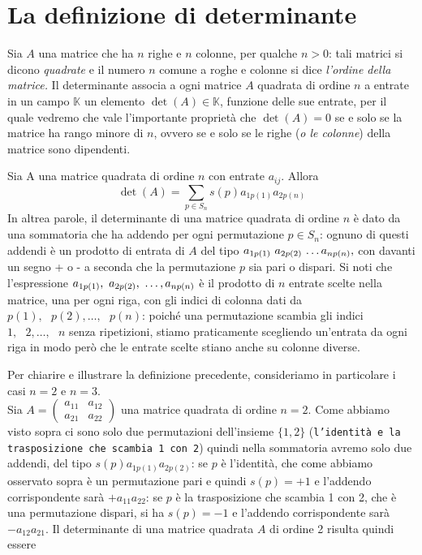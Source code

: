 \section{La definizione di determinante}
Sia $A$ una matrice che ha $n$ righe e $n$ colonne, per qualche $n>0$: tali matrici si dicono {\it quadrate} e il numero $n$ comune a roghe e colonne si dice {\it l'ordine della matrice.} Il determinante associa a ogni matrice $A$ quadrata di ordine $n$ a entrate in un campo $\mathds{K}$ un elemento $\det(A) \in \mathds{K}$, funzione delle sue entrate, per il quale vedremo che vale l'importante proprietà che $\det(A)=0$ se e solo se la matrice ha rango minore di $n$, ovvero se e solo se le righe ({\it o le colonne}) della matrice sono dipendenti.
\begin{definizione}
  Sia A una matrice quadrata di ordine $n$ con entrate $a_{ij}$. Allora
  \begin{equation}
	\det(A)=\sum_{p\in S_n}s(p)a_{1p(1)}a_{2p(n)}
  \end{equation}
  In altrea parole, il determinante di una matrice quadrata di ordine $n$ è dato da una sommatoria che ha addendo per ogni permutazione $p\in S_n$: ognuno di questi addendi è un prodotto di entrata di $A$ del tipo $a_{1p(1)}\text{ } a_{2p(2)} \text{ \dots } a_{np(n)},$ con davanti un segno + o - a seconda che la permutazione $p$ sia pari o dispari. Si noti che l'espressione $a_{1p(1)},\text{ } a_{2p(2)}, \text{ \dots }, a_{np(n)}$ è il prodotto di $n$ entrate scelte nella matrice, una per ogni riga, con gli indici di colonna dati da $p(1),\text{ } p(2),\dots, \text{ } p(n)$: poiché una permutazione scambia gli indici $1,\text{ }2,\dots, \text{ } n$ senza ripetizioni, stiamo praticamente scegliendo un'entrata da ogni riga in modo però che le entrate scelte stiano anche su colonne diverse.
\end{definizione}
Per chiarire e illustrare la definizione precedente, consideriamo in particolare i casi $n = 2$ e $n = 3$.\\
Sia $A=\begin{pmatrix}
         a_{11} & a_{12}\\
         a_{21} & a_{22}
       \end{pmatrix}$ una matrice quadrata di ordine $n=2$. Come abbiamo visto sopra ci sono solo due permutazioni dell'insieme $\{1,2\}$ ({\tt l'identità e la trasposizione che scambia 1 con 2}) quindi nella sommatoria avremo solo due addendi, del tipo $s(p) a_{1p(1)}a_{2p(2)}$: se $p$ è l'identità, che come abbiamo osservato sopra è un permutazione pari e quindi $s(p)=+1$ e l'addendo corrispondente sarà $+a_{11}a_{22}$: se $p$ è la trasposizione che scambia 1 con 2, che è una permutazione dispari, si ha $s(p)=-1$ e l'addendo corrispondente sarà $-a_{12}a_{21}$. Il determinante di una matrice quadrata $A$ di ordine 2 risulta quindi essere
